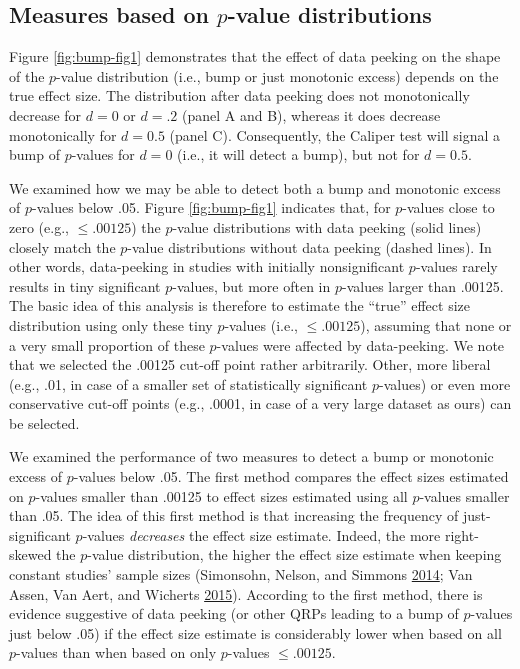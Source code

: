 \documentclass[a5paper]{book}
\begin{document}
\subsection{\texorpdfstring{Measures based on \(p\)-value
distributions}{Measures based on p-value distributions}}\label{measures-based-on-p-value-distributions}

Figure \ref{fig:bump-fig1} demonstrates that the effect of data peeking
on the shape of the \(p\)-value distribution (i.e., bump or just
monotonic excess) depends on the true effect size. The distribution
after data peeking does not monotonically decrease for \(d=0\) or
\(d=.2\) (panel A and B), whereas it does decrease monotonically for
\(d=0.5\) (panel C). Consequently, the Caliper test will signal a bump
of \(p\)-values for \(d=0\) (i.e., it will detect a bump), but not for
\(d=0.5\).

We examined how we may be able to detect both a bump and monotonic
excess of \(p\)-values below .05. Figure \ref{fig:bump-fig1} indicates
that, for \(p\)-values close to zero (e.g., \(\leq.00125\)) the
\(p\)-value distributions with data peeking (solid lines) closely match
the \(p\)-value distributions without data peeking (dashed lines). In
other words, data-peeking in studies with initially nonsignificant
\(p\)-values rarely results in tiny significant \(p\)-values, but more
often in \(p\)-values larger than .00125. The basic idea of this
analysis is therefore to estimate the \enquote{true} effect size
distribution using only these tiny \(p\)-values (i.e., \(\leq.00125\)),
assuming that none or a very small proportion of these \(p\)-values were
affected by data-peeking. We note that we selected the .00125 cut-off
point rather arbitrarily. Other, more liberal (e.g., .01, in case of a
smaller set of statistically significant \(p\)-values) or even more
conservative cut-off points (e.g., .0001, in case of a very large
dataset as ours) can be selected.

We examined the performance of two measures to detect a bump or
monotonic excess of \(p\)-values below .05. The first method compares
the effect sizes estimated on \(p\)-values smaller than .00125 to effect
sizes estimated using all \(p\)-values smaller than .05. The idea of
this first method is that increasing the frequency of just-significant
\(p\)-values \emph{decreases} the effect size estimate. Indeed, the more
right-skewed the \(p\)-value distribution, the higher the effect size
estimate when keeping constant studies' sample sizes (Simonsohn, Nelson,
and Simmons \protect\hyperlink{ref-doi:10.1037ux2fa0033242}{2014}; Van
Assen, Van Aert, and Wicherts
\protect\hyperlink{ref-doi:10.1037ux2fmet0000025}{2015}). According to
the first method, there is evidence suggestive of data peeking (or other
QRPs leading to a bump of \(p\)-values just below .05) if the effect
size estimate is considerably lower when based on all \(p\)-values than
when based on only \(p\)-values \(\leq.00125\).
\end{document}
